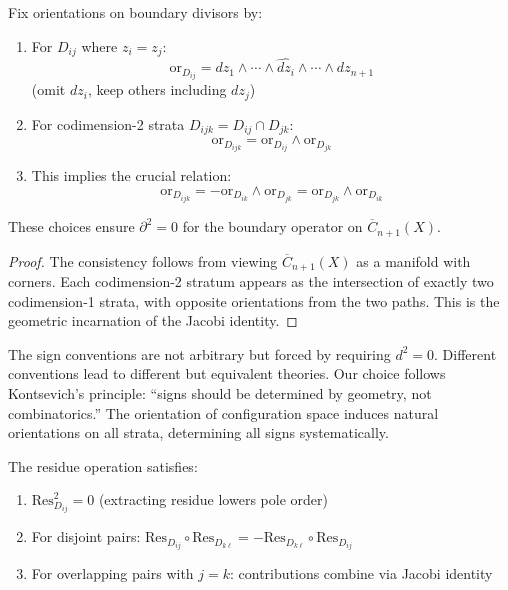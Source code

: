    \begin{lemma}\label{lem:orientation}
   Fix orientations on boundary divisors by:
   \begin{enumerate}
   \item For $D_{ij}$ where $z_i = z_j$:
      $$\text{or}_{D_{ij}} = dz_1 \wedge \cdots \wedge \widehat{dz_i} \wedge \cdots \wedge dz_{n+1}$$
      (omit $dz_i$, keep others including $dz_j$)
      
   \item For codimension-2 strata $D_{ijk} = D_{ij} \cap D_{jk}$:
      $$\text{or}_{D_{ijk}} = \text{or}_{D_{ij}} \wedge \text{or}_{D_{jk}}$$
      
   \item This implies the crucial relation:
      $$\text{or}_{D_{ijk}} = -\text{or}_{D_{ik}} \wedge \text{or}_{D_{jk}} = \text{or}_{D_{jk}} \wedge \text{or}_{D_{ik}}$$
   \end{enumerate}
   
   These choices ensure $\partial^2 = 0$ for the boundary operator on $\overline{C}_{n+1}(X)$.
   \end{lemma}
   
   \begin{proof}
   The consistency follows from viewing $\overline{C}_{n+1}(X)$ as a manifold with corners. Each codimension-2 
   stratum appears as the intersection of exactly two codimension-1 strata, with opposite orientations 
   from the two paths. This is the geometric incarnation of the Jacobi identity.
   \end{proof}
   
   \begin{remark}
   The sign conventions are not arbitrary but forced by requiring $d^2 = 0$. Different conventions lead to 
   different but equivalent theories. Our choice follows Kontsevich's principle: ``signs should be determined 
   by geometry, not combinatorics.'' The orientation of configuration space induces natural orientations on 
   all strata, determining all signs systematically.
   \end{remark}
   
   \begin{lemma}
   The residue operation satisfies:
   \begin{enumerate}
   \item $\text{Res}_{D_{ij}}^2 = 0$ (extracting residue lowers pole order)
   \item For disjoint pairs: $\text{Res}_{D_{ij}} \circ \text{Res}_{D_{k\ell}} = -\text{Res}_{D_{k\ell}} \circ \text{Res}_{D_{ij}}$
   \item For overlapping pairs with $j = k$: contributions combine via Jacobi identity
   \end{enumerate}
   \end{lemma}
   
